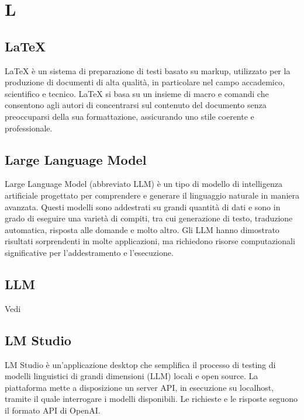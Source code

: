 \section{L}

\vspace{2em}
\subsection*{LaTeX}
\par LaTeX è un sistema di preparazione di testi basato su markup, utilizzato per la produzione di documenti di alta qualità, in particolare nel campo accademico, scientifico e tecnico. LaTeX si basa su un insieme di macro e comandi che consentono agli autori di concentrarsi sul contenuto del documento senza preoccuparsi della sua formattazione, assicurando uno stile coerente e professionale.

\vspace{2em}
\subsection*{Large Language Model}
\par Large Language Model (abbreviato LLM) è un tipo di modello di intelligenza artificiale progettato per comprendere e generare il linguaggio naturale in maniera avanzata. Questi modelli sono addestrati su grandi quantità di dati e sono in grado di eseguire una varietà di compiti, tra cui generazione di testo, traduzione automatica, risposta alle domande e molto altro. Gli LLM hanno dimostrato risultati sorprendenti in molte applicazioni, ma richiedono risorse computazionali significative per l'addestramento e l'esecuzione.

\vspace{2em}
\subsection*{LLM}
\par Vedi 

\vspace{2em}
\subsection*{LM Studio}
\par LM Studio è un'applicazione desktop che semplifica il processo di testing di modelli linguistici di grandi dimensioni (LLM) locali e open source. La piattaforma mette a disposizione un server API, in esecuzione su localhost, tramite il quale interrogare i modelli disponibili. Le richieste e le risposte seguono il formato API di OpenAI.


